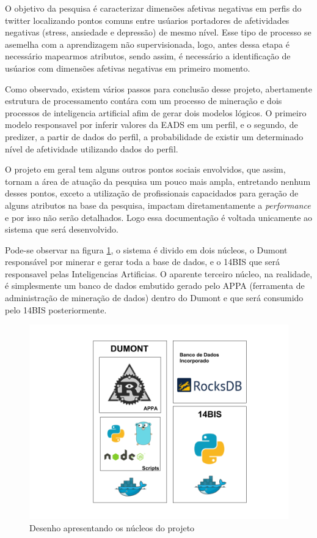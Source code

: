 O objetivo da pesquisa é caracterizar dimensões afetivas negativas em perfis do twitter localizando pontos comuns entre usúarios portadores de afetividades negativas (stress, ansiedade e depressão) de mesmo nível. Esse tipo de processo se asemelha com a aprendizagem não supervisionada, logo, antes dessa etapa é necessário mapearmos atributos, sendo assim, é necessário a identificação de usúarios com dimensões afetivas negativas em primeiro momento.

Como observado, existem vários passos para conclusão desse projeto, abertamente estrutura de processamento contára com um processo de mineração e dois processos de inteligencia artificial afim de gerar dois modelos lógicos. O primeiro modelo responsavel por inferir valores da EADS em um perfil, e o segundo, de predizer, a partir de dados do perfil, a probabilidade de existir um determinado nível de afetividade utilizando dados do perfil.

O projeto em geral tem alguns outros pontos sociais envolvidos, que assim, tornam a área de atuação da pesquisa um pouco mais ampla, entretando nenhum desses pontos, exceto a utilização de profissionais capacidados para geração de alguns atributos na base da pesquisa, impactam diretamentamente a \textit{performance} e por isso não serão detalhados. Logo essa documentação é voltada unicamente ao sistema que será desenvolvido.

Pode-se observar na figura \ref{fig:tecnologias}, o sistema é divido em dois núcleos, o Dumont responsável por minerar e gerar toda a base de dados, e o 14BIS que será responsavel pelas Inteligencias Artificias. O aparente terceiro núcleo, na realidade, é simplesmente um banco de dados embutido gerado pelo APPA (ferramenta de administração de mineração de dados) dentro do Dumont e que será consumido pelo 14BIS posteriormente.

\begin{figure}
    \centering
    \includegraphics[width=.8\textwidth]{imagens/tecnologias.png}
    \caption{Desenho apresentando os núcleos do projeto}
    \label{fig:tecnologias}
\end{figure}

